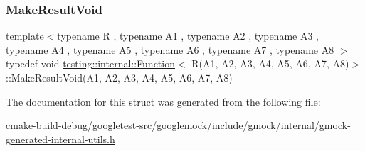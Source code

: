\subsubsection{\texorpdfstring{MakeResultVoid}{MakeResultVoid}}
{\footnotesize\ttfamily template$<$typename R , typename A1 , typename A2 , typename A3 , typename A4 , typename A5 , typename A6 , typename A7 , typename A8 $>$ \\
typedef void \mbox{\hyperlink{structtesting_1_1internal_1_1Function}{testing\+::internal\+::\+Function}}$<$ R(A1, A2, A3, A4, A5, A6, A7, A8)$>$\+::Make\+Result\+Void(A1, A2, A3, A4, A5, A6, A7, A8)}



The documentation for this struct was generated from the following file\+:\begin{DoxyCompactItemize}
\item 
cmake-\/build-\/debug/googletest-\/src/googlemock/include/gmock/internal/\mbox{\hyperlink{gmock-generated-internal-utils_8h}{gmock-\/generated-\/internal-\/utils.\+h}}\end{DoxyCompactItemize}
